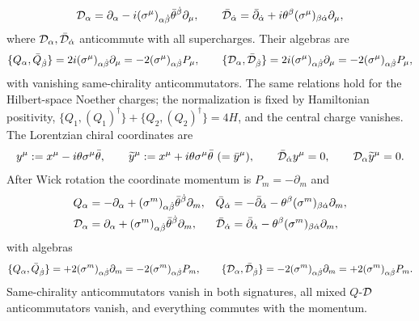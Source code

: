 \begin{equation}
\mathcal{D}_\alpha=\partial_\alpha
-i(\sigma^\mu)_{\alpha\dot\beta}\bar\theta^{\dot\beta}\partial_\mu,\qquad
\bar{\mathcal{D}}_{\dot\alpha}=\bar\partial_{\dot\alpha}
+i\theta^\beta(\sigma^\mu)_{\beta\dot\alpha}\partial_\mu ,
\label{eq:2:DL}
\end{equation}
where $\mathcal{D}_\alpha,\bar{\mathcal{D}}_{\dot\alpha}$ anticommute with all supercharges. Their
algebras are
\begin{equation}
\{Q_\alpha,\bar Q_{\dot\beta}\}
=2i(\sigma^\mu)_{\alpha\dot\beta}\partial_\mu
=-2(\sigma^\mu)_{\alpha\dot\beta}P_\mu,\qquad
\{\mathcal{D}_\alpha,\bar{\mathcal{D}}_{\dot\beta}\}
=2i(\sigma^\mu)_{\alpha\dot\beta}\partial_\mu
=-2(\sigma^\mu)_{\alpha\dot\beta}P_\mu ,
\label{eq:2:algebraL}
\end{equation}
with vanishing same-chirality anticommutators. The same relations hold for the
Hilbert-space Noether charges; the normalization is fixed by Hamiltonian
positivity, $\{Q_1,(Q_1)^\dagger\}+\{Q_2,(Q_2)^\dagger\}=4H$, and the central
charge vanishes. The Lorentzian chiral coordinates are
\begin{equation}
y^\mu:=x^\mu-i\theta\sigma^\mu\bar\theta,\qquad
\widetilde y^\mu:=x^\mu+i\theta\sigma^\mu\bar\theta \ (=\bar y^\mu),\qquad
\bar{\mathcal{D}}_{\dot\alpha}y^\mu=0,\qquad
\mathcal{D}_\alpha\widetilde y^\mu=0 .
\label{eq:2:ychiralL}
\end{equation}
After Wick rotation the coordinate momentum is $P_m=-\partial_m$ and
\begin{equation}
\begin{aligned}
Q_\alpha&=-\partial_\alpha
+(\sigma^m)_{\alpha\dot\beta}\bar\theta^{\dot\beta}\partial_m, &
\bar Q_{\dot\alpha}&=-\bar\partial_{\dot\alpha}
-\theta^\beta(\sigma^m)_{\beta\dot\alpha}\partial_m,\\
\mathcal{D}_\alpha&=\partial_\alpha
+(\sigma^m)_{\alpha\dot\beta}\bar\theta^{\dot\beta}\partial_m, &
\bar{\mathcal{D}}_{\dot\alpha}&=\bar\partial_{\dot\alpha}
-\theta^\beta(\sigma^m)_{\beta\dot\alpha}\partial_m ,
\end{aligned}
\label{eq:2:QDE}
\end{equation}
with algebras
\begin{equation}
\{Q_\alpha,\bar Q_{\dot\beta}\}
=+2(\sigma^m)_{\alpha\dot\beta}\partial_m
=-2(\sigma^m)_{\alpha\dot\beta}P_m,\qquad
\{\mathcal{D}_\alpha,\bar{\mathcal{D}}_{\dot\beta}\}
=-2(\sigma^m)_{\alpha\dot\beta}\partial_m
=+2(\sigma^m)_{\alpha\dot\beta}P_m .
\label{eq:2:algebraE}
\end{equation}
Same-chirality anticommutators vanish in both signatures, all mixed
$Q$-$\mathcal{D}$ anticommutators vanish, and everything commutes with the momentum.
